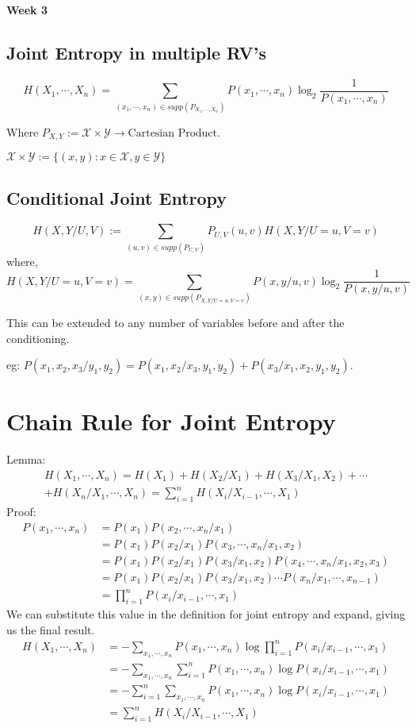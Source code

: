 \documentclass{article}
\begin{document}
\begin{center}
\textbf{\huge{Week 3}}
\end{center}
\subsection{Joint Entropy in multiple RV's}

$$H(X_1, \cdots, X_n)= \sum_{ (x_1, \cdots, x_n) \in supp(P_{X_1, \cdots, X_n})} P(x_1, \cdots, x_n) \log_2 \frac{1}{P(x_1, \cdots, x_n)}$$

Where $P_{X,Y} := \mathcal{X} \times \mathcal{Y} \rightarrow \text{Cartesian Product}$.

$\mathcal{X} \times \mathcal{Y} := \{ (x,y): x \in \mathcal{X}, y\in \mathcal{Y}\} $

\subsection{Conditional Joint Entropy}
$$H(X,Y/U,V):= \sum_{(u,v) \in supp(P_{U,V})} P_{U,V}(u,v)H(X,Y/U=u,V=v) $$
where,
$$ H(X,Y/U=u,V=v) = \sum_{(x,y) \in supp(P_{X,Y/U=u,V=v})} P(x,y/u,v) \log_2 \frac{1}{P(x,y/u,v)}$$

This can be extended to any number of variables before and after the conditioning.

eg: $P(x_1,x_2,x_3/y_1,y_2)= P(x_1,x_2/x_3,y_1,y_2)+ P(x_3/x_1,x_2,y_1,y_2)$.
\section{Chain Rule for Joint Entropy}

Lemma:
\begin{multline}
    H(X_1, \cdots, X_n)= H(X_1)+ H(X_2 / X_1)+ H(X_3/ X_1, X_2)+ \cdots \\ + H(X_n/ X_1, \cdots, X_n) =  \sum_{i=1}^{n} H(X_i/ X_{i-1},\cdots, X_1)
\end{multline}
Proof:
\begin{align*}
    P(x_1,\cdots,x_n)&=P(x_1)P(x_2,\cdots,x_n/x_1) \\
    &= P(x_1)P(x_2/x_1)P(x_3,\cdots,x_n/x_1,x_2) \\
    &= P(x_1)P(x_2/x_1)P(x_3/x_1,x_2)P(x_4,\cdots,x_n/x_1,x_2,x_3) \\
    &= P(x_1)P(x_2/x_1)P(x_3/x_1,x_2)\cdots P(x_n/x_1,\cdots,x_{n-1}) \\
    &= \prod_{i=1}^{n} P(x_i / x_{i-1}, \cdots, x_1)
\end{align*}
We can substitute this value in the definition for joint entropy and expand, giving us the final result.
\begin{align*}
    H(X_1,\cdots, X_n) &= - \sum_{x_1,\cdots,x_n} P(x_1,\cdots,x_n) \log \prod_{i=1}^{n} P(x_i / x_{i-1}, \cdots, x_1) \\
    &= - \sum_{x_1,\cdots,x_n} \sum_{i=1}^{n} P(x_1,\cdots,x_n) \log P(x_i / x_{i-1}, \cdots, x_1) \\
    &= - \sum_{i=1}^{n} \sum_{x_1,\cdots,x_n} P(x_1,\cdots,x_n) \log P(x_i / x_{i-1}, \cdots, x_1) \\
    &= \sum_{i=1}^{n} H(X_i/ X_{i-1},\cdots, X_1)
\end{align*}
\end{document}
